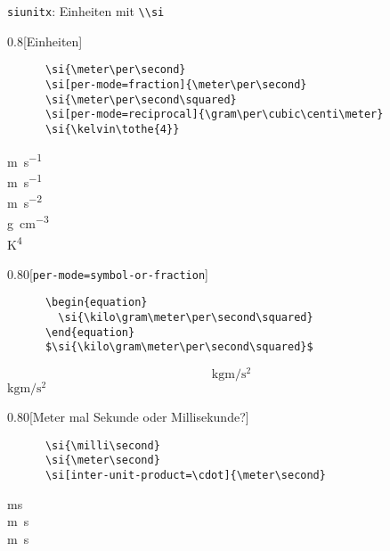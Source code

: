 \begin{frame}[fragile]{\texttt{siunitx}: Einheiten mit \lstinline+\\si+}
  \begin{CodeExample}{0.8}[Einheiten]
    \begin{lstlisting}
      \si{\meter\per\second} 
      \si[per-mode=fraction]{\meter\per\second}
      \si{\meter\per\second\squared}
      \si[per-mode=reciprocal]{\gram\per\cubic\centi\meter}
      \si{\kelvin\tothe{4}}
    \end{lstlisting}
  \CodeResult
    \si{\meter\per\second} \\
    \si[per-mode=fraction]{\meter\per\second}\\
    \si{\meter\per\second\squared}\\
    \si[per-mode=reciprocal]{\gram\per\cubic\centi\meter}\\
    \si{\kelvin\tothe{4}}\\
  \end{CodeExample}
  \begin{CodeExample}{0.80}[\texttt{per-mode=symbol-or-fraction}]
    \begin{lstlisting}
      \begin{equation}
        \si{\kilo\gram\meter\per\second\squared}
      \end{equation}
      $\si{\kilo\gram\meter\per\second\squared}$
    \end{lstlisting}
  \CodeResult
    \begin{equation}
      \si{\kilo\gram\meter\per\second\squared}
    \end{equation}
    $\si{\kilo\gram\meter\per\second\squared}$
  \end{CodeExample}
  \begin{CodeExample}{0.80}[Meter mal Sekunde oder Millisekunde?]
    \begin{lstlisting}
      \si{\milli\second}
      \si{\meter\second}
      \si[inter-unit-product=\cdot]{\meter\second}
    \end{lstlisting}
  \CodeResult
    \strut\si{\milli\second}\\
    \si{\meter\second}\\
    \si[inter-unit-product=\cdot]{\meter\second}
  \end{CodeExample}
\end{frame}
